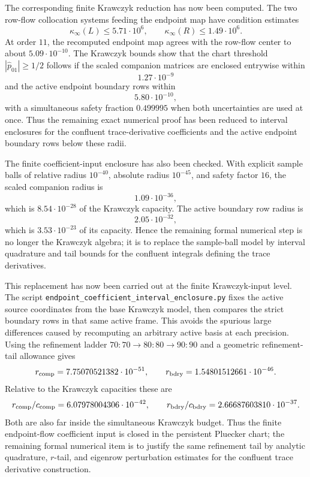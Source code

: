 \documentclass[11pt]{article}
\begin{document}
The corresponding finite Krawczyk reduction has now been computed.  The two
row-flow collocation systems feeding the endpoint map have condition estimates
\[
  \kappa_\infty(L)\le5.71\cdot10^6,\qquad
  \kappa_\infty(R)\le1.49\cdot10^6.
\]
At order \(11\), the recomputed endpoint map agrees with the row-flow center to
about \(5.09\cdot10^{-10}\).  The Krawczyk bounds show that the chart threshold
\(|\widehat p_{01}|\ge1/2\) follows if the scaled companion matrices are
enclosed entrywise within
\[
  1.27\cdot10^{-9}
\]
and the active endpoint boundary rows within
\[
  5.80\cdot10^{-10},
\]
with a simultaneous safety fraction \(0.499995\) when both uncertainties are
used at once.  Thus the remaining exact numerical proof has been reduced to
interval enclosures for the confluent trace-derivative coefficients and the
active endpoint boundary rows below these radii.

The finite coefficient-input enclosure has also been checked.  With explicit
sample balls of relative radius \(10^{-40}\), absolute radius \(10^{-45}\), and
safety factor \(16\), the scaled companion radius is
\[
  1.09\cdot10^{-36},
\]
which is \(8.54\cdot10^{-28}\) of the Krawczyk capacity.  The active boundary
row radius is
\[
  2.05\cdot10^{-32},
\]
which is \(3.53\cdot10^{-23}\) of its capacity.  Hence the remaining formal
numerical step is no longer the Krawczyk algebra; it is to replace the
sample-ball model by interval quadrature and tail bounds for the confluent
integrals defining the trace derivatives.

This replacement has now been carried out at the finite Krawczyk-input level.
The script \texttt{endpoint\_coefficient\_interval\_enclosure.py} fixes the
active source coordinates from the base Krawczyk model, then compares the
strict boundary rows in that same active frame.  This avoids the spurious large
differences caused by recomputing an arbitrary active basis at each precision.
Using the refinement ladder \(70{:}70\to80{:}80\to90{:}90\) and a geometric
refinement-tail allowance gives
\[
  r_{\rm comp}=7.75070521382\cdot10^{-51},\qquad
  r_{\rm bdry}=1.54801512661\cdot10^{-46}.
\]
Relative to the Krawczyk capacities these are
\[
  r_{\rm comp}/c_{\rm comp}=6.07978004306\cdot10^{-42},\qquad
  r_{\rm bdry}/c_{\rm bdry}=2.66687603810\cdot10^{-37}.
\]
Both are also far inside the simultaneous Krawczyk budget.  Thus the finite
endpoint-flow coefficient input is closed in the persistent Pluecker chart;
the remaining formal numerical item is to justify the same refinement tail by
analytic quadrature, \(r\)-tail, and eigenrow perturbation estimates for the
confluent trace derivative construction.
\end{document}

